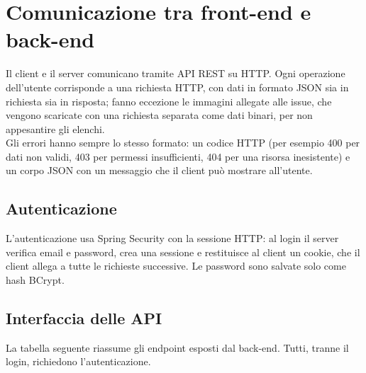 \section{Comunicazione tra front-end e back-end}
Il client e il server comunicano tramite API REST su HTTP. Ogni operazione dell'utente corrisponde a una richiesta HTTP, con dati in formato JSON sia in richiesta sia in risposta; fanno eccezione le immagini allegate alle issue, che vengono scaricate con una richiesta separata come dati binari, per non appesantire gli elenchi. \\
\indent Gli errori hanno sempre lo stesso formato: un codice HTTP (per esempio 400 per dati non validi, 403 per permessi insufficienti, 404 per una risorsa inesistente) e un corpo JSON con un messaggio che il client può mostrare all'utente.

\subsection{Autenticazione}
L'autenticazione usa Spring Security con la sessione HTTP: al login il server verifica email e password, crea una sessione e restituisce al client un cookie, che il client allega a tutte le richieste successive. Le password sono salvate solo come hash BCrypt. \\

\subsection{Interfaccia delle API}
La tabella seguente riassume gli endpoint esposti dal back-end. Tutti, tranne il login, richiedono l'autenticazione.

